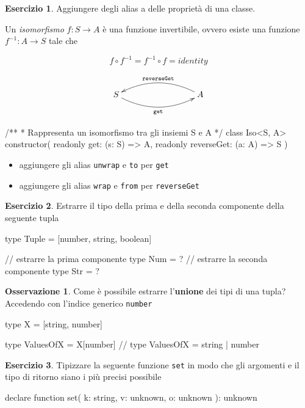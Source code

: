 \documentclass[12pt]{article}
\theoremstyle{definition}
\newtheorem{exercise}{Esercizio}[subsection]
\newtheorem{observation}{Osservazione}[subsection]
\newenvironment{code}
  {\vspace{0.5cm} \VerbatimEnvironment\begin{typescriptcode}}
  {\end{typescriptcode} \vspace{0.2cm}}
\begin{document}
\begin{exercise}
Aggiungere degli alias a delle proprietà di una classe.

Un \emph{isomorfismo} $f: S \rightarrow A$ è una funzione invertibile, ovvero esiste una funzione $f^{-1}: A \rightarrow S$ tale che

$$
f \circ f^{-1} = f^{-1} \circ f = identity
$$

\[
\xymatrixrowsep{3cm}
\xymatrixcolsep{3cm}
\xymatrix{
  S \ar@/_0.5cm/[r]_{\texttt{get}} & A \ar@/_0.5cm/[l]_{\texttt{reverseGet}}
}
\]

\begin{code}
/**
 * Rappresenta un isomorfismo tra gli insiemi S e A
 */
class Iso<S, A> {
  constructor(
    readonly get: (s: S) => A,
    readonly reverseGet: (a: A) => S
  ) {}
}
\end{code}

\begin{itemize}
  \item aggiungere gli alias \texttt{unwrap} e \texttt{to} per \texttt{get}
  \item aggiungere gli alias \texttt{wrap} e \texttt{from} per \texttt{reverseGet}
\end{itemize}

\end{exercise}

\begin{exercise}
Estrarre il tipo della prima e della seconda componente della seguente tupla

\begin{code}
type Tuple = [number, string, boolean]

// estrarre la prima componente
type Num = ?
// estrarre la seconda componente
type Str = ?

\end{code}
\end{exercise}

\begin{observation}
Come è possibile estrarre l'\textbf{unione} dei tipi di una tupla? Accedendo con l'indice generico \texttt{number}

\begin{code}
type X = [string, number]

type ValuesOfX = X[number]
// type ValuesOfX = string | number
\end{code}
\end{observation}

\begin{exercise}
Tipizzare la seguente funzione \texttt{set} in modo che gli argomenti e il tipo di ritorno siano i più precisi possibile

\begin{code}
declare function set(
  k: string,
  v: unknown,
  o: unknown
): unknown
\end{code}
\end{exercise}
\end{document}
